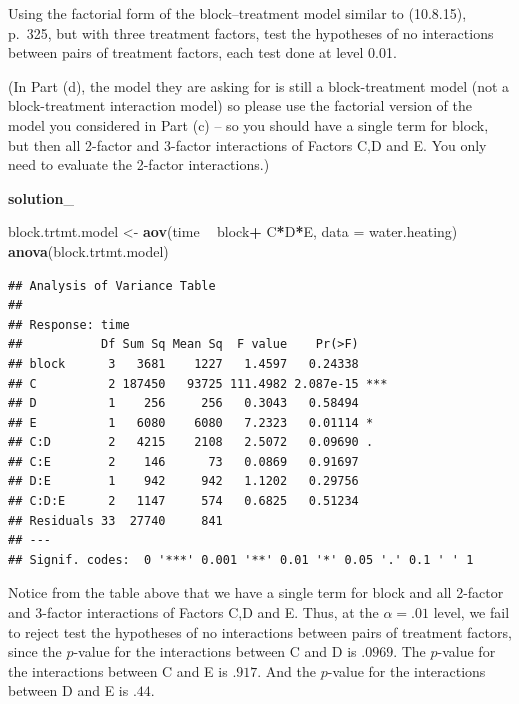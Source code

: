 \documentclass[12pt,]{article}
\newenvironment{Shaded}{\begin{snugshade}}{\end{snugshade}}
\newcommand{\KeywordTok}[1]{\textcolor[rgb]{0.13,0.29,0.53}{\textbf{#1}}}
\newcommand{\DataTypeTok}[1]{\textcolor[rgb]{0.13,0.29,0.53}{#1}}
\newcommand{\StringTok}[1]{\textcolor[rgb]{0.31,0.60,0.02}{#1}}
\newcommand{\OperatorTok}[1]{\textcolor[rgb]{0.81,0.36,0.00}{\textbf{#1}}}
\newcommand{\NormalTok}[1]{#1}
\begin{document}
Using the factorial form of the block--treatment model similar to
(10.8.15), p.~325, but with three treatment factors, test the hypotheses
of no interactions between pairs of treatment factors, each test done at
level 0.01.

(In Part (d), the model they are asking for is still a block-treatment
model (not a block-treatment interaction model) so please use the
factorial version of the model you considered in Part (c) -- so you
should have a single term for block, but then all 2-factor and 3-factor
interactions of Factors C,D and E. You only need to evaluate the
2-factor interactions.)

\textbf{solution}\_

\begin{Shaded}
\begin{Highlighting}[]
\NormalTok{block.trtmt.model <-}\StringTok{ }\KeywordTok{aov}\NormalTok{(time }\OperatorTok{~}\StringTok{ }\NormalTok{block}\OperatorTok{+}\StringTok{ }\NormalTok{C}\OperatorTok{*}\NormalTok{D}\OperatorTok{*}\NormalTok{E, }\DataTypeTok{data =}\NormalTok{ water.heating)}
\KeywordTok{anova}\NormalTok{(block.trtmt.model)}
\end{Highlighting}
\end{Shaded}

\begin{verbatim}
## Analysis of Variance Table
## 
## Response: time
##           Df Sum Sq Mean Sq  F value    Pr(>F)    
## block      3   3681    1227   1.4597   0.24338    
## C          2 187450   93725 111.4982 2.087e-15 ***
## D          1    256     256   0.3043   0.58494    
## E          1   6080    6080   7.2323   0.01114 *  
## C:D        2   4215    2108   2.5072   0.09690 .  
## C:E        2    146      73   0.0869   0.91697    
## D:E        1    942     942   1.1202   0.29756    
## C:D:E      2   1147     574   0.6825   0.51234    
## Residuals 33  27740     841                       
## ---
## Signif. codes:  0 '***' 0.001 '**' 0.01 '*' 0.05 '.' 0.1 ' ' 1
\end{verbatim}

Notice from the table above that we have a single term for block and all
2-factor and 3-factor interactions of Factors C,D and E. Thus, at the
\(\alpha = .01\) level, we fail to reject test the hypotheses of no
interactions between pairs of treatment factors, since the \(p\)-value
for the interactions between C and D is \(.0969\). The \(p\)-value for
the interactions between C and E is \(.917\). And the \(p\)-value for
the interactions between D and E is \(.44\).
\end{document}
